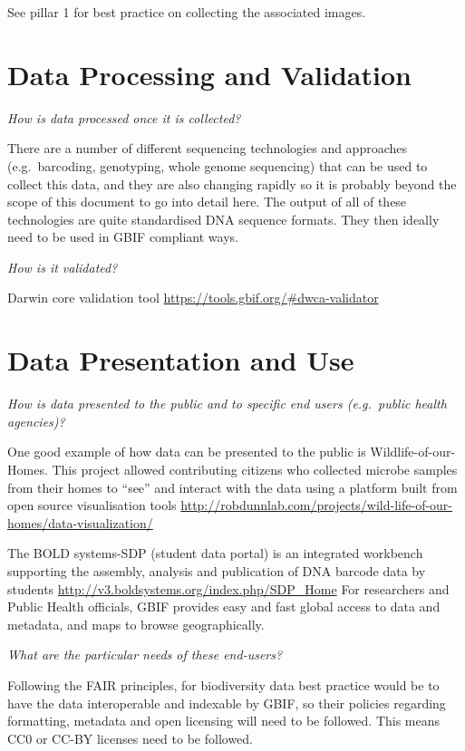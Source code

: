 \documentclass[
]{article}
\begin{document}
See pillar 1 for best practice on collecting the associated images.

\hypertarget{data-processing-and-validation}{%
\section{Data Processing and Validation}\label{data-processing-and-validation}}

\emph{How is data processed once it is collected?}

There are a number of different sequencing technologies and approaches (e.g.~barcoding, genotyping, whole genome sequencing) that can be used to collect this data, and they are also changing rapidly so it is probably beyond the scope of this document to go into detail here. The output of all of these technologies are quite standardised DNA sequence formats. They then ideally need to be used in GBIF compliant ways.

\emph{How is it validated?}

Darwin core validation tool \url{https://tools.gbif.org/\#dwca-validator}

\hypertarget{data-presentation-and-use}{%
\section{Data Presentation and Use}\label{data-presentation-and-use}}

\emph{How is data presented to the public and to specific end users (e.g.~public health agencies)?}

One good example of how data can be presented to the public is Wildlife-of-our-Homes. This project allowed contributing citizens who collected microbe samples from their homes to ``see'' and interact with the data using a platform built from open source visualisation tools \url{http://robdunnlab.com/projects/wild-life-of-our-homes/data-visualization/}

The BOLD systems-SDP (student data portal) is an integrated workbench supporting the assembly, analysis and publication of DNA barcode data by students \url{http://v3.boldsystems.org/index.php/SDP_Home}
For researchers and Public Health officials, GBIF provides easy and fast global access to data and metadata, and maps to browse geographically.

\emph{What are the particular needs of these end-users?}

Following the FAIR principles, for biodiversity data best practice would be to have the data interoperable and indexable by GBIF, so their policies regarding formatting, metadata and open licensing will need to be followed. This means CC0 or CC-BY licenses need to be followed.
\end{document}
